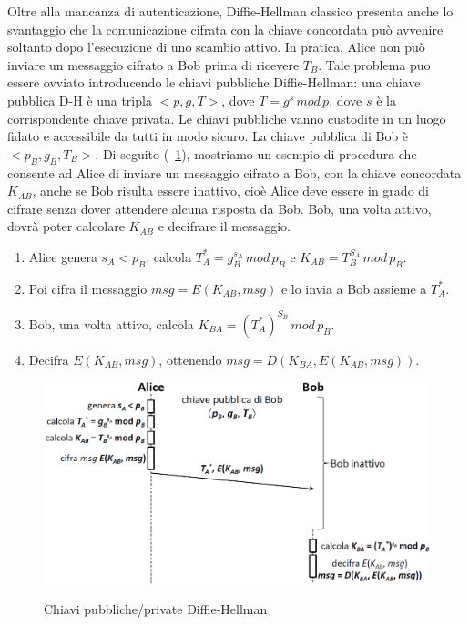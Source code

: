 Oltre alla mancanza di autenticazione, Diffie-Hellman classico presenta anche lo svantaggio che la comunicazione cifrata con la chiave concordata può avvenire soltanto dopo l'esecuzione di uno scambio attivo. In pratica, Alice non può inviare un messaggio cifrato a Bob prima di ricevere $T_{B}$. Tale problema puo essere ovviato introducendo le chiavi pubbliche Diffie-Hellman: una chiave pubblica D-H è una tripla $<p, g, T>$, dove $T = g^s \, mod \, p$, dove $s$ è la corrispondente chiave privata. Le chiavi pubbliche vanno custodite in un luogo fidato e accessibile da tutti in modo sicuro. La chiave pubblica di Bob è $<p_{B}, g_{B}, T_{B}>$. \newline \newline
Di seguito (\figurename~\ref{fig:authex}), mostriamo un esempio di procedura che consente ad Alice di inviare un messaggio cifrato a Bob, con la chiave concordata $K_{AB}$, anche se Bob risulta essere inattivo, cioè Alice deve essere in grado di cifrare senza dover attendere alcuna risposta da Bob. Bob, una volta attivo, dovrà poter calcolare $K_{AB}$ e decifrare il messaggio.
\begin{enumerate}
\item Alice genera $s_{A}<p_{B}$, calcola $T_{A}^{*}=g_{B}^{s_{A}} \, mod \, p_{B}$ e $K_{AB}=T_{B}^{S_{A}} \, mod \, p_{B}$.
\item Poi cifra il messaggio $msg=E(K_{AB},msg)$ e lo invia a Bob assieme a $T_{A}^{*}$.
\item Bob, una volta attivo, calcola  $K_{BA}=(T_{A}^*)^{S_{B}} \, mod \, p_{B}$.
\item Decifra $E(K_{AB},msg)$, ottenendo $msg=D(K_{BA},E(K_{AB},msg))$.
\end{enumerate}
\begin{figure}[htbp]
	\centering%
	\subfigure%
	{\includegraphics[scale=0.6, keepaspectratio]{Immagini/chiave_pubblica/DiffieHellman_pubseckey.png}}
	\caption{Chiavi pubbliche/private Diffie-Hellman}
	\label{fig:authex}
\end{figure} 

